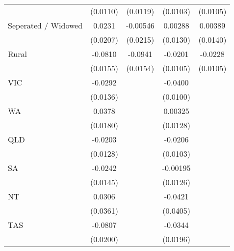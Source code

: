 {\begin{tabular}{l*{4}{c}}
                    &    (0.0110)         &    (0.0119)         &    (0.0103)         &    (0.0105)         \\
[1em]
Seperated / Widowed &      0.0231         &    -0.00546         &     0.00288         &     0.00389         \\
                    &    (0.0207)         &    (0.0215)         &    (0.0130)         &    (0.0140)         \\
[1em]
Rural               &     -0.0810\sym{***}&     -0.0941\sym{***}&     -0.0201         &     -0.0228\sym{*}  \\
                    &    (0.0155)         &    (0.0154)         &    (0.0105)         &    (0.0105)         \\
[1em]
VIC                 &     -0.0292\sym{*}  &                     &     -0.0400\sym{***}&                     \\
                    &    (0.0136)         &                     &    (0.0100)         &                     \\
[1em]
WA                  &      0.0378\sym{*}  &                     &     0.00325         &                     \\
                    &    (0.0180)         &                     &    (0.0128)         &                     \\
[1em]
QLD                 &     -0.0203         &                     &     -0.0206\sym{*}  &                     \\
                    &    (0.0128)         &                     &    (0.0103)         &                     \\
[1em]
SA                  &     -0.0242         &                     &    -0.00195         &                     \\
                    &    (0.0145)         &                     &    (0.0126)         &                     \\
[1em]
NT                  &      0.0306         &                     &     -0.0421         &                     \\
                    &    (0.0361)         &                     &    (0.0405)         &                     \\
[1em]
TAS                 &     -0.0807\sym{***}&                     &     -0.0344         &                     \\
                    &    (0.0200)         &                     &    (0.0196)         &                     \\

\end{tabular}}
